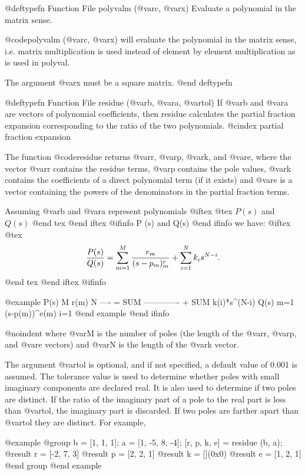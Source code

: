 @deftypefn {Function File} {} polyvalm (@var{c}, @var{x})
Evaluate a polynomial in the matrix sense.

@code{polyvalm (@var{c}, @var{x})} will evaluate the polynomial in the
matrix sense, i.e. matrix multiplication is used instead of element by
element multiplication as is used in polyval.

The argument @var{x} must be a square matrix.
@end deftypefn

@deftypefn {Function File} {} residue (@var{b}, @var{a}, @var{tol})
If @var{b} and @var{a} are vectors of polynomial coefficients, then
residue calculates the partial fraction expansion corresponding to the
ratio of the two polynomials.
@cindex partial fraction expansion

The function @code{residue} returns @var{r}, @var{p}, @var{k}, and
@var{e}, where the vector @var{r} contains the residue terms, @var{p}
contains the pole values, @var{k} contains the coefficients of a direct
polynomial term (if it exists) and @var{e} is a vector containing the
powers of the denominators in the partial fraction terms.

Assuming @var{b} and @var{a} represent polynomials
@iftex
@tex
$P(s)$ and $Q(s)$
@end tex
@end iftex
@ifinfo
 P (s) and Q(s)
@end ifinfo
 we have:
@iftex
@tex
$$
{P(s)\over Q(s)} = \sum_{m=1}^M {r_m\over (s-p_m)^e_m}
  + \sum_{i=1}^N k_i s^{N-i}.
$$
@end tex
@end iftex
@ifinfo

@example
 P(s)    M       r(m)         N
 ---- = SUM -------------  + SUM k(i)*s^(N-i)
 Q(s)   m=1 (s-p(m))^e(m)    i=1
@end example
@end ifinfo

@noindent
where @var{M} is the number of poles (the length of the @var{r},
@var{p}, and @var{e} vectors) and @var{N} is the length of the @var{k}
vector.

The argument @var{tol} is optional, and if not specified, a default
value of 0.001 is assumed.  The tolerance value is used to determine
whether poles with small imaginary components are declared real.  It is
also used to determine if two poles are distinct.  If the ratio of the
imaginary part of a pole to the real part is less than @var{tol}, the
imaginary part is discarded.  If two poles are farther apart than
@var{tol} they are distinct.  For example,

@example
@group
 b = [1, 1, 1];
 a = [1, -5, 8, -4];
 [r, p, k, e] = residue (b, a);
     @result{} r = [-2, 7, 3]
     @result{} p = [2, 2, 1]
     @result{} k = [](0x0)
     @result{} e = [1, 2, 1]
@end group
@end example

